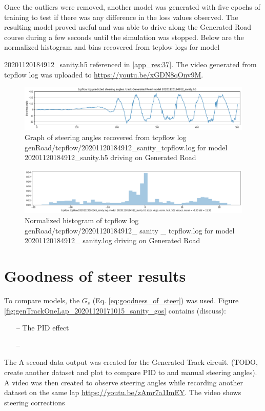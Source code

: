 Once the outliers were removed, another model was generated with five epochs of training to test if there was any difference in the loss values observed. The resulting model proved useful and was able to drive along the Generated Road course during a few seconds until the simulation was stopped. Below are the normalized histogram and bins recovered from tcplow logs for model  
  
20201120184912\_sanity.h5 referenced in \ref{app_res:37}. The video generated from tcpflow log was uploaded to \href{https://youtu.be/xGDN8qOnv9M}{https://youtu.be/xGDN8qOnv9M}.

\begin{figure}[ht]
 \centering 
 \includegraphics[width=\textwidth]{Figures/tcpflow_20201120184912_sanity_graph.png}
 \caption{Graph of steering angles recovered from tcpflow log genRoad/tcpflow/20201120184912\_sanity\_tcpflow.log for model 20201120184912\_sanity.h5 driving on Generated Road}
 \label{fig:tcpflow_20201120184912_graph}
\end{figure}

\begin{figure}[ht]
 \centering 
 \includegraphics[width=\textwidth]{Figures/tcpflow_20201120184912_sanity_bins.png}
 \caption{Normalized histogram of tcpflow log genRoad/tcpflow/20201120184912\_ sanity \_ tcpflow.log for model 20201120184912\_ sanity.log driving on Generated Road}
 \label{fig:tcpflow_20201120184912_bins} 
\end{figure}

\section{Goodness of steer results}

To compare models, the $G_s$ (Eq. \ref{eq:goodness_of_steer}) was used. Figure  \ref{fig:genTrackOneLap_20201120171015_sanity_gos} contains (discuss):
\begin{itemize}
    \item[--] The PID effect
    \item[--] 
\end{itemize}
The
A second data output was created for the Generated Track circuit. (TODO, create another dataset and plot to compare PID to and manual steering angles).
A video was then created to observe steering angles while recording another dataset on the same lap \href{https://youtu.be/zAmr7a1ImEY}{https://youtu.be/zAmr7a1ImEY}. The video shows steering corrections



